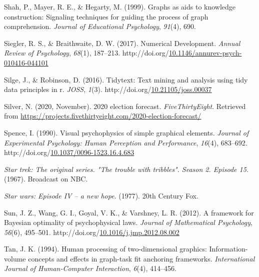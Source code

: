 \documentclass[print]{nuthesis}
\newlength{\cslhangindent}
\newenvironment{CSLReferences}%
{\setlength{\parindent}{0pt}%
\everypar{\setlength{\hangindent}{\cslhangindent}}\ignorespaces}%
{\par}
\begin{document}
\begin{CSLReferences}{1}{0}
\leavevmode{}%
Shah, P., Mayer, R. E., \& Hegarty, M. (1999). Graphs as aids to knowledge construction: Signaling techniques for guiding the process of graph comprehension. \emph{Journal of Educational Psychology}, \emph{91}(4), 690.

\leavevmode{}%
Siegler, R. S., \& Braithwaite, D. W. (2017). Numerical {Development}. \emph{Annual Review of Psychology}, \emph{68}(1), 187--213. http://doi.org/\href{https://doi.org/10.1146/annurev-psych-010416-044101}{10.1146/annurev-psych-010416-044101}

\leavevmode{}%
Silge, J., \& Robinson, D. (2016). Tidytext: Text mining and analysis using tidy data principles in r. \emph{JOSS}, \emph{1}(3). http://doi.org/\href{https://doi.org/10.21105/joss.00037}{10.21105/joss.00037}

\leavevmode{}%
Silver, N. (2020, November). 2020 election forecast. \emph{FiveThirtyEight}. Retrieved from \url{https://projects.fivethirtyeight.com/2020-election-forecast/}

\leavevmode{}%
Spence, I. (1990). Visual psychophysics of simple graphical elements. \emph{Journal of Experimental Psychology: Human Perception and Performance}, \emph{16}(4), 683--692. http://doi.org/\href{https://doi.org/10.1037/0096-1523.16.4.683}{10.1037/0096-1523.16.4.683}

\leavevmode{}%
\emph{Star trek: The original series. "The trouble with tribbles". Season 2. Episode 15.} (1967). Broadcast on NBC.

\leavevmode{}%
\emph{Star wars: Episode IV -- a new hope}. (1977). 20th Century Fox.

\leavevmode{}%
Sun, J. Z., Wang, G. I., Goyal, V. K., \& Varshney, L. R. (2012). A framework for {Bayesian} optimality of psychophysical laws. \emph{Journal of Mathematical Psychology}, \emph{56}(6), 495--501. http://doi.org/\href{https://doi.org/10.1016/j.jmp.2012.08.002}{10.1016/j.jmp.2012.08.002}

\leavevmode{}%
Tan, J. K. (1994). Human processing of two-dimensional graphics: Information-volume concepts and effects in graph-task fit anchoring frameworks. \emph{International Journal of Human-Computer Interaction}, \emph{6}(4), 414--456.


\end{CSLReferences}
\end{document}
